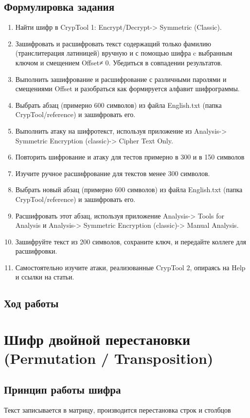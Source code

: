 \documentclass[a4paper, 14pt]{extarticle}
\begin{document}
\subsection{Формулировка задания}
\begin{enumerate}
    \item Найти шифр в CrypTool 1: Encrypt/Decrypt-> Symmetric (Classic).
    \item Зашифровать и расшифровать текст содержащий только фамилию (транслитерация латиницей) вручную и с помощью шифра c выбранным ключом и смещением Offset≠ 0. Убедиться в совпадении результатов.
    \item Выполнить зашифрование и расшифрование с различными паролями и смещениями Offset и разобраться как формируется алфавит шифрограммы.
    \item Выбрать абзац (примерно 600 символов) из файла English.txt (папка CrypTool/reference) и зашифровать его.
    \item Выполнить атаку на шифротекст, используя приложение из Analysis-> Symmetric Encryption (classic)-> Cipher Text Only.
    \item Повторить шифрование и атаку для тестов примерно в 300 и в 150 символов
    \item Изучите ручное расшифрование для текстов менее 300 символов.
    \item Выбрать новый абзац (примерно 600 символов) из файла English.txt (папка CrypTool/reference) и зашифровать его.
    \item Расшифровать этот абзац, используя приложение Analysis-> Tools for Analysis и Analysis-> Symmetric Encryption (classic)-> Manual Analysis.
    \item  Зашифруйте текст из 200 символов, сохраните ключ, и передайте коллеге для расшифровки.
    \item  Самостоятельно изучите атаки, реализованные CrypTool 2, опираясь на Help и ссылки на статьи.
\end{enumerate}

\subsection{Ход работы}
\lipsum[1]

\section{Шифр двойной перестановки (Permutation / Transposition)}
\subsection{Принцип работы шифра}
Текст записывается в матрицу, производится перестановка строк и столбцов
\end{document}
